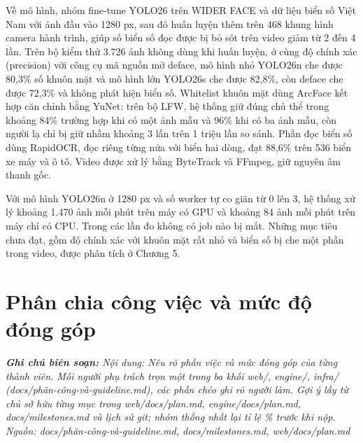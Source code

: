 \documentclass[a4paper,12pt]{article}
\begin{document}
Về mô hình, nhóm fine-tune YOLO26 trên WIDER FACE và dữ liệu biển số Việt Nam với ảnh đầu vào 1280 px, sau đó huấn luyện thêm trên 468 khung hình camera hành trình, giúp số biển số đọc được bị bỏ sót trên video giảm từ 2 đến 4 lần. Trên bộ kiểm thử 3.726 ảnh không dùng khi huấn luyện, ở cùng độ chính xác (precision) với công cụ mã nguồn mở deface, mô hình nhỏ YOLO26n che được 80,3\% số khuôn mặt và mô hình lớn YOLO26s che được 82,8\%, còn deface che được 72,3\% và không phát hiện biển số. Whitelist khuôn mặt dùng ArcFace kết hợp căn chỉnh bằng YuNet: trên bộ LFW, hệ thống giữ đúng chủ thể trong khoảng 84\% trường hợp khi có một ảnh mẫu và 96\% khi có ba ảnh mẫu, còn người lạ chỉ bị giữ nhầm khoảng 3 lần trên 1 triệu lần so sánh. Phần đọc biển số dùng RapidOCR, đọc riêng từng nửa với biển hai dòng, đạt 88,6\% trên 536 biển xe máy và ô tô. Video được xử lý bằng ByteTrack và FFmpeg, giữ nguyên âm thanh gốc.

Với mô hình YOLO26n ở 1280 px và số worker tự co giãn từ 0 lên 3, hệ thống xử lý khoảng 1.470 ảnh mỗi phút trên máy có GPU và khoảng 84 ảnh mỗi phút trên máy chỉ có CPU. Trong các lần đo không có job nào bị mất. Những mục tiêu chưa đạt, gồm độ chính xác với khuôn mặt rất nhỏ và biển số bị che một phần trong video, được phân tích ở Chương 5.

\clearpage
\section*{Phân chia công việc và mức độ đóng góp}
\renewcommand{\thetable}{P.\arabic{table}}
{\small\itshape\noindent\textbf{Ghi chú biên soạn:} Nội dung: Nêu rõ phần việc và mức đóng góp của từng thành viên. Mỗi người phụ trách trọn một trong ba khối web/, engine/, infra/ (docs/phân-công-và-guideline.md), các phần chéo ghi rõ người làm. Gợi ý lấy từ chủ sở hữu từng mục trong web/docs/plan.md, engine/docs/plan.md, docs/milestones.md và lịch sử git; nhóm thống nhất lại tỉ lệ \% trước khi nộp.  Nguồn: docs/phân-công-và-guideline.md, docs/milestones.md, web/docs/plan.md\par\vspace{8pt}}
\end{document}
